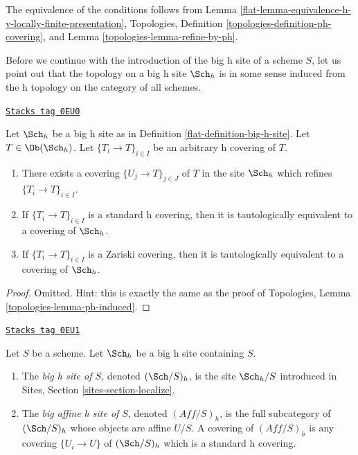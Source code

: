 The equivalence of the conditions follows from
Lemma \ref{flat-lemma-equivalence-h-v-locally-finite-presentation},
Topologies, Definition \ref{topologies-definition-ph-covering}, and
Lemma \ref{topologies-lemma-refine-by-ph}.

\medskip\noindent
Before we continue with the introduction of the big h site of
a scheme $S$, let us point out that the topology on a big h site
$\Sch_h$ is in some sense induced from the h topology
on the category of all schemes.

\begin{lemma}[H induced]
\label{flat-lemma-h-induced}
\href{https://stacks.math.columbia.edu/tag/0EU0}{\texttt{Stacks tag 0EU0}}

Let $\Sch_h$ be a big h site as in
Definition \ref{flat-definition-big-h-site}.
Let $T \in \Ob(\Sch_h)$.
Let $\{T_i \to T\}_{i \in I}$ be an arbitrary h covering of $T$.
\begin{enumerate}
\item There exists a covering $\{U_j \to T\}_{j \in J}$ of $T$ in the site
$\Sch_h$ which refines $\{T_i \to T\}_{i \in I}$.
\item If $\{T_i \to T\}_{i \in I}$ is a standard h covering, then
it is tautologically equivalent to a covering of $\Sch_h$.
\item If $\{T_i \to T\}_{i \in I}$ is a Zariski covering, then
it is tautologically equivalent to a covering of $\Sch_h$.
\end{enumerate}
\end{lemma}

\begin{proof}
Omitted. Hint: this is exactly the same as the proof of
Topologies, Lemma \ref{topologies-lemma-ph-induced}.
\end{proof}

\begin{definition}
\label{flat-definition-big-small-h}
\href{https://stacks.math.columbia.edu/tag/0EU1}{\texttt{Stacks tag 0EU1}}

Let $S$ be a scheme. Let $\Sch_h$ be a big h site containing $S$.
\begin{enumerate}
\item The {\it big h site of $S$}, denoted
$(\Sch/S)_h$, is the site $\Sch_h/S$
introduced in Sites, Section \ref{sites-section-localize}.
\item The {\it big affine h site of $S$}, denoted
$(\textit{Aff}/S)_h$, is the full subcategory of
$(\Sch/S)_h$ whose objects are affine $U/S$.
A covering of $(\textit{Aff}/S)_h$ is any covering
$\{U_i \to U\}$ of $(\Sch/S)_h$ which is a standard h covering.
\end{enumerate}
\end{definition}

